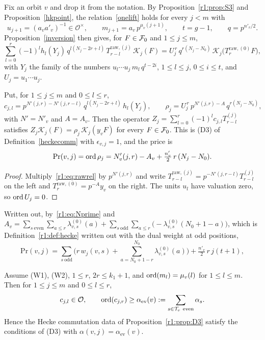 Fix an orbit $v$ and drop it from the notation. By Proposition~\ref{r1:prop:S3} and Proposition~\ref{hkpoint}, the relation~\eqref{onelift} holds for every $j<m$ with
\[
u_{j+1}=(a_va'_v)^{-1}\in\mathcal O^\times,\qquad m_{j+1}=a_v\,p^{\mu_v(j+1)},\qquad t=g-1,\qquad q=p^{n'_v/2}.
\]
Proposition~\ref{inversion} then gives, for $F\in\mathcal F_0$ and $1\le j\le m$,
\begin{equation}\label{r1:eq:rawrel}
\sum_{l=0}^r(-1)^lh_l(Y_j)\,q^{l(N_j-2r+l)}\,T^{\mathrm{raw},(j)}_{r-l}\,\mathcal K_j(F)=U_j^{\,r}\,q^{r(N_j-N_0)}\,\mathcal K_j\big(T^{\mathrm{raw},(0)}_rF\big),
\end{equation}
with $Y_j$ the family of the numbers $u_l\cdots u_j\,m_l\,q^{t-2i}$, $1\le l\le j$, $0\le i\le t$, and $U_j=u_1\cdots u_j$.

\begin{proposition}\label{r1:prop:D3}
Put, for $1\le j\le m$ and $0\le l\le r$,
\[
c_{j,l}=p^{N'(j,r)-N'(j,r-l)}\,q^{l(N_j-2r+l)}\,h_l(Y_j),\qquad\rho_j=U_j^{\,r}\,p^{N'(j,r)-A}\,q^{r(N_j-N_0)},
\]
with $N'=N'_v$ and $A=A_v$. Then the operator $Z_j=\sum_{l=0}^r(-1)^lc_{j,l}T^{(j)}_{r-l}$ satisfies $Z_j\mathcal K_j(F)=\rho_j\,\mathcal K_j(y_vF)$ for every $F\in\mathcal F_0$. This is (D3) of Definition~\ref{heckecomm} with $\epsilon_{v,j}=1$, and the price is
\[
\mathrm{Pr}(v,j)=\operatorname{ord}\rho_j=N'_v(j,r)-A_v+\tfrac{n'_v}2\,r\,(N_j-N_0).
\]
\end{proposition}

\begin{proof}
Multiply~\eqref{r1:eq:rawrel} by $p^{N'(j,r)}$ and write $T^{\mathrm{raw},(j)}_{r-l}=p^{-N'(j,r-l)}T^{(j)}_{r-l}$ on the left and $T^{\mathrm{raw},(0)}_r=p^{-A}y_v$ on the right. The units $u_l$ have valuation zero, so $\operatorname{ord} U_j=0$.
\end{proof}

Written out, by~\eqref{r1:eq:Nprime} and $A_v=\sum_{s\ \mathrm{even}}\sum_{a\le r}\lambda^{(0)}_{v,s}(a)+\sum_{s\ \mathrm{odd}}\sum_{a\le r}\big(-\lambda^{(0)}_{v,s}(N_0+1-a)\big)$, which is Definition~\ref{r1:def:hecke} written out with the dual weight at odd positions,
\[
\mathrm{Pr}(v,j)=\sum_{s\ \mathrm{odd}}\Big(r\,w_j(v,s)+\sum_{a=N_0+1-r}^{N_0}\lambda^{(0)}_{v,s}(a)\Big)+\tfrac{n'_v}2\,r\,j(t+1),
\]


\begin{theorem}\label{r1:thm:Cii}
Assume (W1), (W2), $1\le r$, $2r\le k_1+1$, and $\operatorname{ord}(m_l)=\mu_v(l)$ for $1\le l\le m$. Then for $1\le j\le m$ and $0\le l\le r$,
\[
c_{j,l}\in\mathcal O,\qquad \ord(c_{j,r})\ge\alpha_{\mathrm{ev}}(v):=\sum_{s\in\mathcal T_v\ \mathrm{even}}\alpha_s .
\]
Hence the Hecke commutation data of Proposition~\ref{r1:prop:D3} satisfy the conditions of (D3) with $\alpha(v,j)=\alpha_{\mathrm{ev}}(v)$.
\end{theorem}

